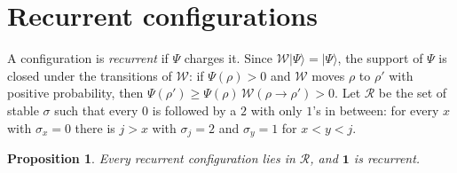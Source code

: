\documentclass[11pt]{amsart}
\newtheorem{proposition}[theorem]{Proposition}
\theoremstyle{definition}
\theoremstyle{remark}
\newcommand{\cR}{\mathcal{R}}
\newcommand{\cW}{\mathcal{W}}
\newcommand{\ket}[1]{|#1\rangle}
\newcommand{\one}{\mathbf{1}}
\begin{document}
\section{Recurrent configurations}\label{sec:recurrent}

A configuration is \emph{recurrent} if $\Psi$ charges it. Since $\cW\ket\Psi=\ket\Psi$, the support of $\Psi$ is closed under the transitions of $\cW$: if $\Psi(\rho)>0$ and $\cW$ moves $\rho$ to $\rho'$ with positive probability, then $\Psi(\rho')\ge\Psi(\rho)\,\cW(\rho\to\rho')>0$. Let $\cR$ be the set of stable $\sigma$ such that every $0$ is followed by a $2$ with only $1$'s in between: for every $x$ with $\sigma_x=0$ there is $j>x$ with $\sigma_j=2$ and $\sigma_y=1$ for $x<y<j$.

\begin{proposition}\label{prop:rec}
Every recurrent configuration lies in $\cR$, and $\one$ is recurrent.
\end{proposition}
\end{document}
